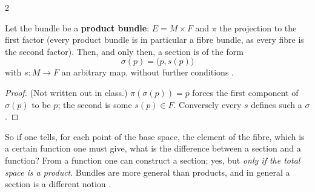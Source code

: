 \begin{paracol}{2}
\begin{proposition}\label{prop:mf-sections-product}
Let the bundle be a \textbf{product bundle}: $E=M\times F$ and $\pi$ the projection to the first factor (every product bundle is in particular a fibre bundle, as every fibre is the second factor). Then, and only then, a section is of the form
\[
  \sigma(p)=\bigl(p,s(p)\bigr)
\]
with $s\colon M\to F$ an arbitrary map, without further conditions .
\end{proposition}
\begin{proof}
(Not written out in class.) $\pi(\sigma(p))=p$ forces the first component of $\sigma(p)$ to be $p$; the second is some $s(p)\in F$. Conversely every $s$ defines such a $\sigma$.
\end{proof}
So if one tells, for each point of the base space, the element of the fibre, which is a certain function one must give, what is the difference between a section and a function? From a function one can construct a section; yes, but \emph{only if the total space is a product}. Bundles are more
general than products, and in general a section is a different notion .


\end{paracol}
